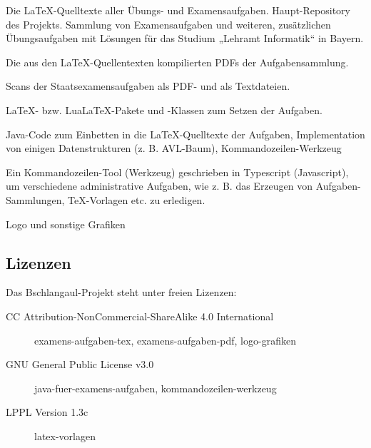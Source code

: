 \documentclass{bschlangaul-basis}
\begin{document}
\begin{description}
{Die LaTeX-Quelltexte aller Übungs- und Examensaufgaben.
Haupt-Repository des Projekts. Sammlung von Examensaufgaben und
weiteren, zusätzlichen Übungsaufgaben mit Lösungen für das Studium
„Lehramt Informatik“ in Bayern.}

{Die aus den LaTeX-Quellentexten kompilierten PDFs der Aufgabensammlung.}

{Scans der Staatsexamensaufgaben als PDF- und als Textdateien.}

{LaTeX- bzw. LuaLaTeX-Pakete und -Klassen zum Setzen der Aufgaben.}

{Java-Code zum Einbetten in die LaTeX-Quelltexte der Aufgaben,
Implementation von einigen Datenstrukturen (z. B. AVL-Baum),
Kommandozeilen-Werkzeug}

{Ein Kommandozeilen-Tool (Werkzeug) geschrieben in Typescript
(Javascript), um verschiedene administrative Aufgaben, wie z. B. das
Erzeugen von Aufgaben-Sammlungen, TeX-Vorlagen etc. zu erledigen.}

{Logo und sonstige Grafiken}
\end{description}

%

\subsection{Lizenzen}

Das Bschlangaul-Projekt steht unter freien Lizenzen:

\begin{description}

\item[CC Attribution-NonCommercial-ShareAlike 4.0 International]

examens-aufgaben-tex,
examens-aufgaben-pdf,
logo-grafiken

\item[GNU General Public License v3.0]

java-fuer-examens-aufgaben,
kommandozeilen-werkzeug

\item[LPPL Version 1.3c]

latex-vorlagen
\end{description}
\end{document}
